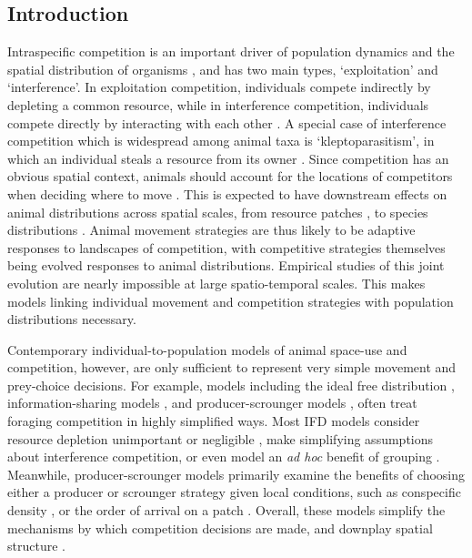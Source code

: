 
\begin{refsection}
\section*{Introduction}
    Intraspecific competition is an important driver of population dynamics and the spatial distribution of organisms \citep{krebs1978}, and has two main types, `exploitation' and `interference'.
    In exploitation competition, individuals compete indirectly by depleting a common resource, while in interference competition, individuals compete directly by interacting with each other \citep{birch1957,case1974,keddy2001}.
    A special case of interference competition which is widespread among animal taxa is `kleptoparasitism', in which an individual steals a resource from its owner \citep{iyengar2008}.
    Since competition has an obvious spatial context, animals should account for the locations of competitors when deciding where to move \citep{nathan2008}.
    This is expected to have downstream effects on animal distributions across spatial scales, from resource patches \citep{fretwell1970}, to species distributions \citep{duckworth2007,schlagel2020}.
    Animal movement strategies are thus likely to be adaptive responses to landscapes of competition, with competitive strategies themselves being evolved responses to animal distributions.
    Empirical studies of this joint evolution are nearly impossible at large spatio-temporal scales.
    This makes models linking individual movement and competition strategies with population distributions necessary.

    Contemporary individual-to-population models of animal space-use \citep[reviewed in][]{deangelis2019} and competition, however, are only sufficient to represent very simple movement and prey-choice decisions.
    For example, models including the ideal free distribution \citep[IFD;][]{fretwell1970}, information-sharing models \citep[][]{giraldeau1999,folmer2012}, and producer-scrounger models \citep[][]{barnard1981,vickery1991,beauchamp2008}, often treat foraging competition in highly simplified ways.
    Most IFD models consider resource depletion unimportant or negligible \citep[continuous input models, see][]{tregenza1995, vandermeer1997}, make simplifying assumptions about interference competition, or even model an \textit{ad hoc} benefit of grouping \citep[e.g.][]{amano2006}.
    Meanwhile, producer-scrounger models primarily examine the benefits of choosing either a producer or scrounger strategy given local conditions, such as conspecific density \citep{vickery1991}, or the order of arrival on a patch \citep{beauchamp2008}.
    Overall, these models simplify the mechanisms by which competition decisions are made, and downplay spatial structure \citep[see also][]{holmgren1995, garay2020, spencer2018}.


\end{refsection}
